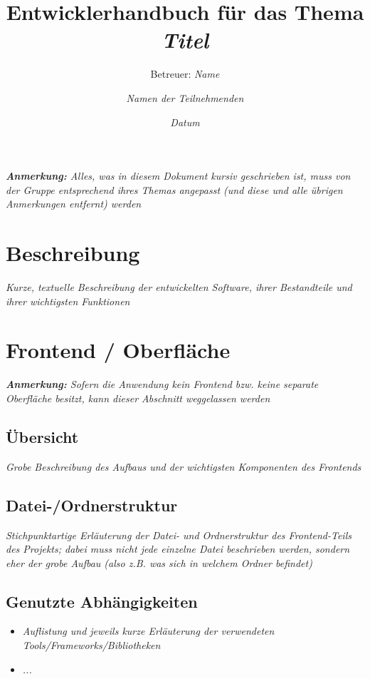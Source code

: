 \documentclass[a4paper,10pt]{scrartcl}
\title{Entwicklerhandbuch für das Thema \glqq\textit{Titel}\grqq}
\subtitle{Betreuer: \textit{Name}}
\author{\textit{Namen der Teilnehmenden}}
\date{\textit{Datum}}
\begin{document}
\maketitle

\textit{\textbf{Anmerkung:} Alles, was in diesem Dokument kursiv geschrieben ist, muss von der Gruppe entsprechend ihres Themas angepasst (und diese und alle übrigen Anmerkungen entfernt) werden}

\tableofcontents

\newpage

\section{Beschreibung}

\textit{Kurze, textuelle Beschreibung der entwickelten Software, ihrer Bestandteile und ihrer wichtigsten Funktionen}

\newpage

\section{Frontend / Oberfläche}

\textit{\textbf{Anmerkung:} Sofern die Anwendung kein Frontend bzw. keine separate Oberfläche besitzt, kann dieser Abschnitt weggelassen werden}

\subsection{Übersicht}

\textit{Grobe Beschreibung des Aufbaus und der wichtigsten Komponenten des Frontends}

\subsection{Datei-/Ordnerstruktur}

\textit{Stichpunktartige Erläuterung der Datei- und Ordnerstruktur des Frontend-Teils des Projekts; dabei muss nicht jede einzelne Datei beschrieben werden, sondern eher der grobe Aufbau (also z.B. was sich in welchem Ordner befindet)}

\subsection{Genutzte Abhängigkeiten}

\begin{itemize}
    \item \textit{Auflistung und jeweils kurze Erläuterung der verwendeten Tools/Frameworks/Bibliotheken}
    \item \textit{...}
\end{itemize}
\end{document}
